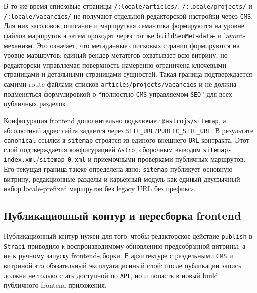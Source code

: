 В то же время списковые страницы \texttt{/:locale/articles/}, \texttt{/:locale/projects/}
и \texttt{/:locale/vacancies/} не получают отдельной редакторской настройки через
\texttt{CMS}.
Для них заголовок, описание и маршрутная семантика формируются на уровне файлов маршрутов
и затем проходят через тот же \texttt{buildSeoMetadata}- и layout-механизм. Это означает,
что метаданные списковых страниц формируются на уровне маршрутов: единый рендер
метатегов охватывает всю витрину, но редакторски управляемая поверхность намеренно
ограничена ключевыми страницами и детальными страницами сущностей. Такая граница
подтверждается самими route-файлами списков \texttt{articles/projects/vacancies} и не
должна подменяться формулировкой о
``полностью \texttt{CMS}-управляемом \texttt{SEO}'' для всех публичных разделов.

Конфигурация frontend дополнительно подключает \texttt{@astrojs/sitemap}, а абсолютный
адрес сайта задается через \texttt{SITE\_URL}/\texttt{PUBLIC\_SITE\_URL}. В результате
\texttt{canonical}-ссылки и \texttt{sitemap} строятся из единого внешнего
\texttt{URL}-контракта. Этот слой подтверждается конфигурацией \texttt{Astro}, сборочным
выводом \texttt{sitemap-index.xml}/\texttt{sitemap-0.xml} и приемочными проверками
публичных маршрутов. Его текущая граница также определена явно: \texttt{sitemap}
публикует основную витрину, редакционные разделы и карьерный модуль как единый
двуязычный набор locale-prefixed маршрутов без legacy URL без префикса.

\subsection{Публикационный контур и пересборка frontend}

Публикационный контур нужен для того, чтобы редакторское действие \texttt{publish} в
\texttt{Strapi} приводило к воспроизводимому обновлению предсобранной витрины, а не к
ручному запуску frontend-сборки. В архитектуре с раздельными \texttt{CMS} и витриной
это обязательный эксплуатационный слой: после публикации запись должна не только стать
доступной по \texttt{API}, но и попасть в новый build публичного frontend-приложения.


